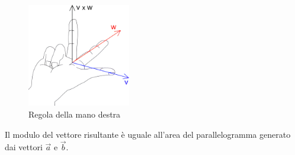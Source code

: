 \documentclass[a4paper]{article}
\theoremstyle{break}
\theoremstyle{break}
\theoremstyle{break}
\theoremstyle{break}
\begin{document}
\begin{figure}[H]
	\centering
	\includegraphics[width=0.4\textwidth]{manoDestra}
	\caption{Regola della mano destra}
\end{figure}

\noindent Il modulo del vettore risultante è uguale all'area del parallelogramma generato dai vettori \( \vec{a} \) e \( \vec{b} \).
\end{document}
